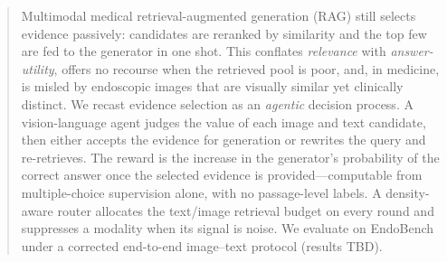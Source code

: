 \begin{abstract}
Multimodal medical retrieval-augmented generation (RAG) still selects evidence
passively: candidates are reranked by similarity and the top few are fed to the
generator in one shot. This conflates \emph{relevance} with
\emph{answer-utility}, offers no recourse when the retrieved pool is poor, and,
in medicine, is misled by endoscopic images that are visually similar yet
clinically distinct. We recast evidence selection as an \emph{agentic} decision
process. A vision-language agent judges the value of each image and text
candidate, then either accepts the evidence for generation or rewrites the query
and re-retrieves. The reward is the increase in the generator's probability of
the correct answer once the selected evidence is provided---computable from
multiple-choice supervision alone, with no passage-level labels. A density-aware
router allocates the text/image retrieval budget on every round and suppresses a
modality when its signal is noise. We evaluate on EndoBench under a corrected
end-to-end image--text protocol (results TBD).
\end{abstract}
